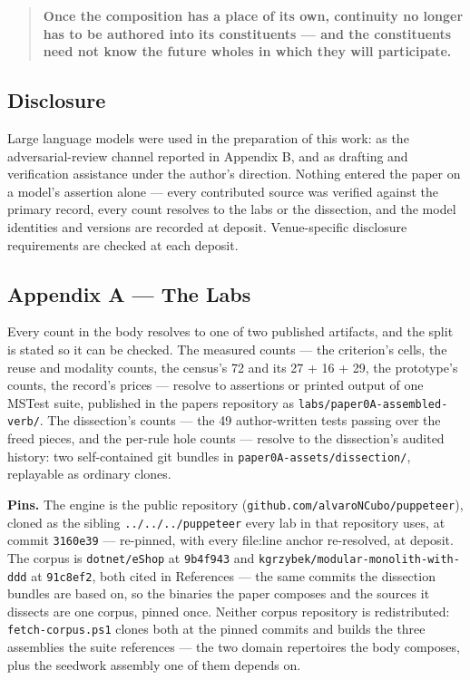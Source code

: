 \documentclass[
]{article}
\begin{document}
\begin{quote}
\textbf{Once the composition has a place of its own, continuity no
longer has to be authored into its constituents --- and the constituents
need not know the future wholes in which they will participate.}
\end{quote}

\subsection{Disclosure}\label{disclosure}

Large language models were used in the preparation of this work: as the
adversarial-review channel reported in Appendix B, and as drafting and
verification assistance under the author's direction. Nothing entered
the paper on a model's assertion alone --- every contributed source was
verified against the primary record, every count resolves to the labs or
the dissection, and the model identities and versions are recorded at
deposit. Venue-specific disclosure requirements are checked at each
deposit.

\subsection{Appendix A --- The Labs}\label{appendix-a-the-labs}

Every count in the body resolves to one of two published artifacts, and
the split is stated so it can be checked. The measured counts --- the
criterion's cells, the reuse and modality counts, the census's 72 and
its 27 + 16 + 29, the prototype's counts, the record's prices ---
resolve to assertions or printed output of one MSTest suite, published
in the papers repository as \texttt{labs/paper0A-assembled-verb/}. The
dissection's counts --- the 49 author-written tests passing over the
freed pieces, and the per-rule hole counts --- resolve to the
dissection's audited history: two self-contained git bundles in
\texttt{paper0A-assets/dissection/}, replayable as ordinary clones.

\textbf{Pins.} The engine is the public repository
(\texttt{github.com/alvaroNCubo/puppeteer}), cloned as the sibling
\texttt{../../../puppeteer} every lab in that repository uses, at commit
\texttt{3160e39} --- re-pinned, with every file:line anchor re-resolved,
at deposit. The corpus is \texttt{dotnet/eShop} at \texttt{9b4f943} and
\texttt{kgrzybek/modular-monolith-with-ddd} at \texttt{91c8ef2}, both
cited in References --- the same commits the dissection bundles are
based on, so the binaries the paper composes and the sources it dissects
are one corpus, pinned once. Neither corpus repository is redistributed:
\texttt{fetch-corpus.ps1} clones both at the pinned commits and builds
the three assemblies the suite references --- the two domain repertoires
the body composes, plus the seedwork assembly one of them depends on.
\end{document}
